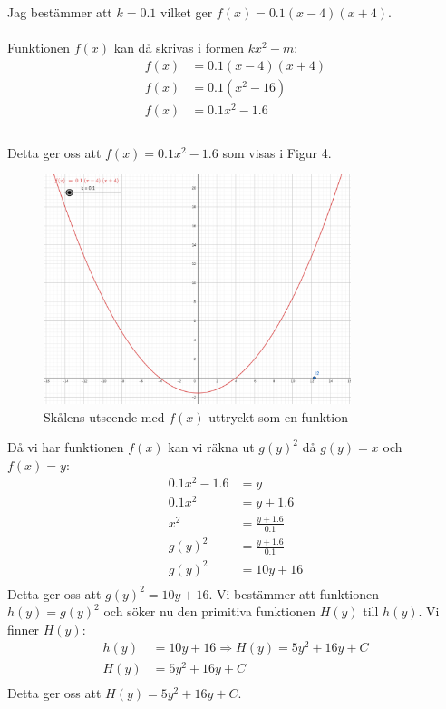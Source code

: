 \documentclass[12pt]{article}
\begin{document}
Jag bestämmer att $k=0.1$ vilket ger $f(x)=0.1(x-4)(x+4)$.
\\\\
Funktionen $f(x)$ kan då skrivas i formen $kx^2-m$:
\begin{align*}
    f(x)&=0.1(x-4)(x+4)\\
    f(x)&=0.1(x^2-16)\\
    f(x)&=0.1x^2-1.6\\
\end{align*}
\\
Detta ger oss att $f(x)=0.1x^2-1.6$ som visas i Figur 4.
\begin{figure}[H]
    \centering
    \renewcommand{\thefigure}{4}
    \includegraphics[width=0.8\textwidth]{figur4.png}
    \caption{Skålens utseende med $f(x)$ uttryckt som en funktion}
\end{figure}
Då vi har funktionen $f(x)$ kan vi räkna ut $g{(y)}^2$ då $g(y)=x$ och $f(x)=y$:
\begin{align*}
    0.1x^2-1.6&=y\\
    0.1x^2&=y+1.6\\
    x^2&=\frac{y+1.6}{0.1}\\
    g{(y)}^2&=\frac{y+1.6}{0.1}\\
    g{(y)}^2&=10y+16\\
\end{align*}
Detta ger oss att $g{(y)}^2=10y+16$.
Vi bestämmer att funktionen $h(y)=g{(y)}^2$ och söker nu den primitiva funktionen $H(y)$ till $h(y)$. Vi finner $H(y)$:
\begin{align*}
    h(y)&=10y+16 \Rightarrow H(y)=5y^2+16y+C\\
    H(y)&=5y^2+16y+C\\
\end{align*}
Detta ger oss att $H(y)=5y^2+16y+C$.\\
\end{document}
